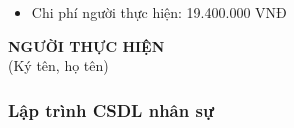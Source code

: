 {\begin{minipage}{\textwidth}
\begin{itemize}
        \item Chi phí người thực hiện: 19.400.000 VNĐ
    \end{itemize}
    \vspace{1cm}
    \begin{flushleft}
        \hspace{8cm} \textbf{NGƯỜI THỰC HIỆN} \\
        \hspace{8.8cm} (Ký tên, họ tên) \\
        \vspace{1cm}
    \end{flushleft}
    \end{minipage}
}
% 
\subsubsection{Lập trình CSDL nhân sự}
